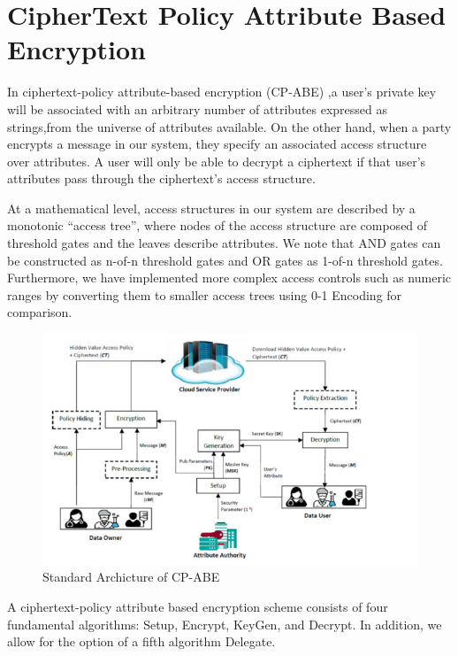 \chapter{CipherText Policy Attribute Based Encryption}



In ciphertext-policy attribute-based encryption (CP-ABE) ,a user's private key will be associated with an arbitrary number of attributes expressed as strings,from the universe of attributes available. 
On the other hand, when a party encrypts a message in our system, they specify an associated access structure over attributes. A user will only be able to decrypt a ciphertext if that user’s attributes pass through the ciphertext’s access structure. 


   At a mathematical level, access structures in our system are described by a monotonic “access tree”, where nodes of the access structure are composed of threshold gates and the leaves describe attributes. We note that AND gates can be constructed as n-of-n threshold gates and OR gates as 1-of-n threshold gates. Furthermore, we have implemented more complex access controls such as numeric ranges by converting them to smaller access trees using 0-1 Encoding for comparison.
\begin{figure}
    \centering
    \includegraphics[width=0.8\linewidth]{Images/CBCArchitecture.jpeg}
    \caption{Standard Archicture of CP-ABE}
    \label{fig:enter-label}
\end{figure}
    A ciphertext-policy attribute based encryption scheme consists of four fundamental algorithms: Setup, Encrypt, KeyGen, and Decrypt. In addition, we allow for the option of a fifth algorithm Delegate.

